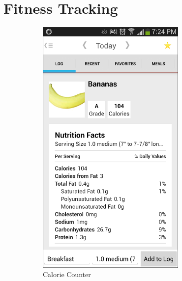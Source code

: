 \section{Fitness Tracking}
\label{Sec:FitnessTracking}
\begin{figure}
\centering
\begin{subfigure}[b]{0.4\textwidth}
\includegraphics[width=0.8\textwidth]{images/CCScreenshot.PNG}
\caption{Calorie Counter}
\label{fig:CCScreenshot}
\end{subfigure}
\qquad
\begin{subfigure}[b]{0.4\textwidth}

\end{subfigure}
\end{figure}
